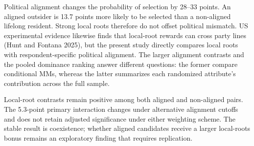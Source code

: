 \documentclass[
  letterpaper,
  DIV=11,
  numbers=noendperiod]{scrartcl}
\newcommand{\criticmarkupadd}[1]{#1}
\newcommand{\criticmarkuprm}[1]{}
\begin{document}
\criticmarkuprm{National political congruence can outweigh even strong
local roots. Aligned profiles gain}\criticmarkupadd{Political alignment
changes the probability of selection by} 28--33 \criticmarkuprm{points
over non-aligned profiles.}\criticmarkupadd{points.} An aligned
\criticmarkuprm{profile with the outsider-with-local-knowledge
statement}\criticmarkupadd{outsider} is 13.7 points more likely to be
selected than a non-aligned \criticmarkuprm{profile with the
lifelong-resident statement. Municipal
embeddedness}\criticmarkupadd{lifelong resident. Strong local roots}
therefore \criticmarkuprm{remains consequential without displacing the
national divide.}\criticmarkupadd{do not offset political mismatch.} US
experimental evidence likewise finds that local-root rewards can cross
party lines (Hunt and Fontana 2025), \criticmarkuprm{while German
local-executive evidence shows that nomination background conditions
spatial voting (Zissel 2026). Neither}\criticmarkupadd{but the present}
study \criticmarkuprm{estimates}\criticmarkupadd{directly compares local
roots with respondent-specific political alignment. The larger alignment
contrasts and} the \criticmarkuprm{government-alignment contrast used
here.}\criticmarkupadd{pooled dominance ranking answer different
questions: the former compare conditional MMs, whereas the latter
summarizes each randomized attribute's contribution across the full
sample.}

\criticmarkuprm{Municipal-statement}\criticmarkupadd{Local-root}
contrasts remain positive among both aligned and non-aligned pairs. The
5.3-point primary interaction
\criticmarkuprm{weakens}\criticmarkupadd{changes} under alternative
\criticmarkuprm{attitude}\criticmarkupadd{alignment} cutoffs and does
not retain adjusted significance under either weighting scheme. The
\criticmarkuprm{evidence therefore establishes coexistence,
not}\criticmarkupadd{stable result is coexistence; whether aligned
candidates receive} a \criticmarkuprm{stable interaction between the
cues. Place matters alongside national alignment (Munis 2021), but it
does not erase the principal partisan division in this
experiment.}\criticmarkupadd{larger local-roots bonus remains an
exploratory finding that requires replication.}
\end{document}
